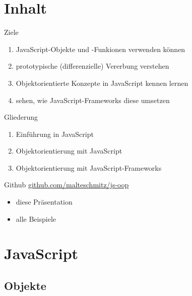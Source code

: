 \section*{Inhalt}

\begin{frame}{Ziele}
  \begin{enumerate}
    \item JavaScript-Objekte und -Funkionen verwenden können
    \item prototypische (differenzielle) Vererbung verstehen
    \item Objektorientierte Konzepte in JavaScript kennen lernen
    \item sehen, wie JavaScript-Frameworks diese umsetzen
  \end{enumerate}
\end{frame}

\begin{frame}{Gliederung}
  \begin{enumerate}[{Teil} I]
    \item Einführung in JavaScript
    \item Objektorientierung mit JavaScript
    \item Objektorientierung mit JavaScript-Frameworks
  \end{enumerate}
\end{frame}

\begin{frame}{Github}
  \url{github.com/malteschmitz/js-oop}
  \begin{itemize}
    \item diese Präsentation
    \item alle Beispiele
  \end{itemize}
\end{frame}

\section{JavaScript}

\subsection{Objekte}


